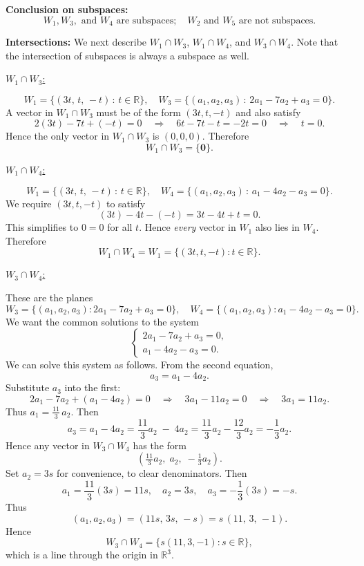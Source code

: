 \documentclass{article}
\begin{document}
\bigskip

\noindent
\textbf{Conclusion on subspaces:}
\[
W_1, W_3, \text{ and } W_4 \text{ are subspaces}; \quad W_2 \text{ and } W_5 \text{ are not subspaces.}
\]

\bigskip

\noindent
\textbf{Intersections:} We next describe $W_1\cap W_3$, $W_1\cap W_4$, and $W_3\cap W_4$. Note that the intersection of subspaces is always a subspace as well.

\medskip
\noindent
\underline{$W_1 \cap W_3$:}

\[
W_1 = \{(3t,\, t,\, -t)\,:\, t\in \mathbb{R}\}, 
\quad
W_3 = \{(a_1,a_2,a_3)\,:\, 2a_1 -7a_2 + a_3 = 0\}.
\]
A vector in $W_1 \cap W_3$ must be of the form $(3t, t, -t)$ and also satisfy
\[
2(3t) - 7t + (-t) = 0
\quad \Longrightarrow \quad 6t - 7t - t = -2t = 0
\quad \Longrightarrow \quad t=0.
\]
Hence the only vector in $W_1 \cap W_3$ is $(0,0,0)$. Therefore
\[
\boxed{W_1 \cap W_3 = \{\mathbf{0}\}.}
\]

\medskip
\noindent
\underline{$W_1 \cap W_4$:}

\[
W_1 = \{(3t,\, t,\, -t)\,:\, t\in \mathbb{R}\}, 
\quad
W_4 = \{(a_1,a_2,a_3)\,:\, a_1 -4a_2 - a_3 = 0\}.
\]
We require $(3t, t, -t)$ to satisfy
\[
(3t) - 4t - (-t) = 3t - 4t + t = 0.
\]
This simplifies to $0=0$ for all $t$. Hence \emph{every} vector in $W_1$ also lies in $W_4$. Therefore
\[
\boxed{W_1 \cap W_4 = W_1 = \{(3t, t, -t) : t \in \mathbb{R}\}.}
\]

\medskip
\noindent
\underline{$W_3 \cap W_4$:}

These are the planes
\[
W_3 = \{(a_1,a_2,a_3) : 2a_1 - 7a_2 + a_3 = 0\}, 
\quad
W_4 = \{(a_1,a_2,a_3) : a_1 - 4a_2 - a_3 = 0\}.
\]
We want the common solutions to the system
\[
\begin{cases}
2a_1 - 7a_2 + a_3 = 0,\\
a_1 - 4a_2 - a_3 = 0.
\end{cases}
\]
We can solve this system as follows. From the second equation,
\[
a_3 = a_1 - 4a_2.
\]
Substitute $a_3$ into the first:
\[
2a_1 - 7a_2 + (a_1 - 4a_2) = 0 
\quad \Longrightarrow \quad 3a_1 - 11a_2 = 0 
\quad \Longrightarrow \quad 3a_1 = 11a_2.
\]
Thus $a_1 = \tfrac{11}{3}\,a_2$. Then
\[
a_3 = a_1 - 4a_2 = \frac{11}{3}a_2 \;-\; 4a_2 
= \frac{11}{3}a_2 - \frac{12}{3}a_2 
= -\frac{1}{3}a_2.
\]
Hence any vector in $W_3 \cap W_4$ has the form
\[
\left(\tfrac{11}{3}a_2,\; a_2,\; -\tfrac{1}{3}a_2\right).
\]
Set $a_2 = 3s$ for convenience, to clear denominators. Then
\[
a_1 = \frac{11}{3}(3s) = 11s,\quad
a_2 = 3s,\quad
a_3 = -\frac{1}{3}(3s) = -s.
\]
Thus
\[
(a_1, a_2, a_3) = (11s,\,3s,\,-s) = s\,(11,\,3,\,-1).
\]
Hence
\[
\boxed{W_3 \cap W_4 = \{ s(11,3,-1) : s \in \mathbb{R}\},
}
\]
which is a line through the origin in $\mathbb{R}^3$.
\end{document}
